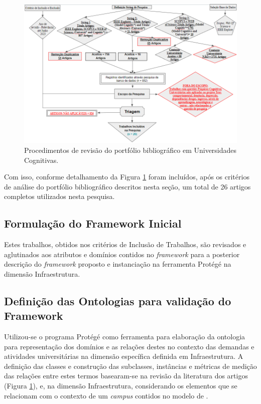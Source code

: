 \documentclass[portuguese]{textolivre}
\begin{document}
\begin{figure}[h!]
    \centering
    \includegraphics[width=\linewidth]{images/FIGURA2.png}
    \caption{Procedimentos de revisão do portfólio bibliográfico em Universidades Cognitivas.}
    \label{fig-2}
\end{figure}

Com isso, conforme detalhamento da Figura \ref{fig-2} foram incluídos, após os critérios de análise do portfólio bibliográfico descritos nesta seção, um total de 26 artigos completos utilizados nesta pesquisa.

\subsection{Formulação do Framework Inicial}
Estes trabalhos, obtidos nos critérios de Inclusão de Trabalhos, são revisados e aglutinados aos atributos e domínios contidos no \textit{framework} \cite{giuriatti2024} para a posterior descrição do \textit{framework} proposto e instanciação na ferramenta Protégé na dimensão Infraestrutura.

\subsection{Definição das Ontologias para validação do Framework}

Utilizou-se o programa Protégé como ferramenta para elaboração da ontologia para representação dos domínios e as relações destes no contexto das demandas e atividades universitárias na dimensão específica definida em Infraestrutura. A definição das classes e construção das subclasses, instâncias e métricas de medição das relações entre estes termos basearam-se na revisão da literatura dos artigos (Figura \ref{fig-2}), e, na dimensão Infraestrutura, considerando os elementos que se relacionam com o contexto de um \textit{campus} contidos no modelo de \textcite{giuriatti2024}.
\end{document}
